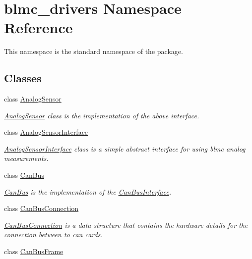 \hypertarget{namespaceblmc__drivers}{}\section{blmc\+\_\+drivers Namespace Reference}
\label{namespaceblmc__drivers}


This namespace is the standard namespace of the package.  


\subsection*{Classes}
\begin{DoxyCompactItemize}
\item 
class \hyperlink{classblmc__drivers_1_1AnalogSensor}{Analog\+Sensor}
\begin{DoxyCompactList}\small\item\em \hyperlink{classblmc__drivers_1_1AnalogSensor}{Analog\+Sensor} class is the implementation of the above interface. \end{DoxyCompactList}\item 
class \hyperlink{classblmc__drivers_1_1AnalogSensorInterface}{Analog\+Sensor\+Interface}
\begin{DoxyCompactList}\small\item\em \hyperlink{classblmc__drivers_1_1AnalogSensorInterface}{Analog\+Sensor\+Interface} class is a simple abstract interface for using blmc analog measurements. \end{DoxyCompactList}\item 
class \hyperlink{classblmc__drivers_1_1CanBus}{Can\+Bus}
\begin{DoxyCompactList}\small\item\em \hyperlink{classblmc__drivers_1_1CanBus}{Can\+Bus} is the implementation of the \hyperlink{classblmc__drivers_1_1CanBusInterface}{Can\+Bus\+Interface}. \end{DoxyCompactList}\item 
class \hyperlink{classblmc__drivers_1_1CanBusConnection}{Can\+Bus\+Connection}
\begin{DoxyCompactList}\small\item\em \hyperlink{classblmc__drivers_1_1CanBusConnection}{Can\+Bus\+Connection} is a data structure that contains the hardware details for the connection between to can cards. \end{DoxyCompactList}\item 
class \hyperlink{classblmc__drivers_1_1CanBusFrame}{Can\+Bus\+Frame}

\end{DoxyCompactItemize}
